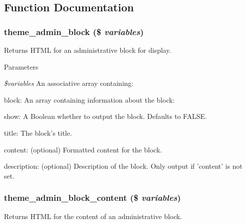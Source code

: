 \subsection{Function Documentation}
\hypertarget{group__themeable_ga8b1a3d4767adfca752cb2d3b92b3f20b}{
\subsubsection[{theme\_\-admin\_\-block}]{\setlength{\rightskip}{0pt plus 5cm}theme\_\-admin\_\-block (\$ {\em variables})}}
\label{group__themeable_ga8b1a3d4767adfca752cb2d3b92b3f20b}
Returns HTML for an administrative block for display.


\begin{DoxyParams}{Parameters}
\item[{\em \$variables}]An associative array containing:
\begin{DoxyItemize}
\item block: An array containing information about the block:
\begin{DoxyItemize}
\item show: A Boolean whether to output the block. Defaults to FALSE.
\item title: The block's title.
\item content: (optional) Formatted content for the block.
\item description: (optional) Description of the block. Only output if 'content' is not set. 
\end{DoxyItemize}
\end{DoxyItemize}\end{DoxyParams}
\hypertarget{group__themeable_ga464c24771bc0b172bbee22ba7184b65d}{
\subsubsection[{theme\_\-admin\_\-block\_\-content}]{\setlength{\rightskip}{0pt plus 5cm}theme\_\-admin\_\-block\_\-content (\$ {\em variables})}}
\label{group__themeable_ga464c24771bc0b172bbee22ba7184b65d}
Returns HTML for the content of an administrative block.


